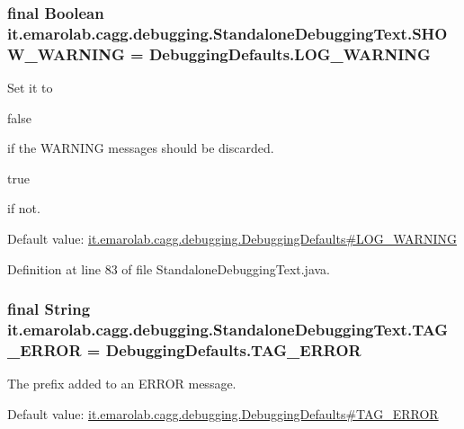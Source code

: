 \hypertarget{classit_1_1emarolab_1_1cagg_1_1debugging_1_1StandaloneDebuggingText_a15ac1cd7df84553b0a7e1990469ea00b}{
\subsubsection[{S\-H\-O\-W\-\_\-\-W\-A\-R\-N\-I\-N\-G}]{\setlength{\rightskip}{0pt plus 5cm}final Boolean it.\-emarolab.\-cagg.\-debugging.\-Standalone\-Debugging\-Text.\-S\-H\-O\-W\-\_\-\-W\-A\-R\-N\-I\-N\-G = {\bf Debugging\-Defaults.\-L\-O\-G\-\_\-\-W\-A\-R\-N\-I\-N\-G}\hspace{0.3cm}{\ttfamily [static]}}}\label{classit_1_1emarolab_1_1cagg_1_1debugging_1_1StandaloneDebuggingText_a15ac1cd7df84553b0a7e1990469ea00b}
Set it to
\begin{DoxyCode}
\textcolor{keyword}{false} 
\end{DoxyCode}
 if the W\-A\-R\-N\-I\-N\-G messages should be discarded.
\begin{DoxyCode}
\textcolor{keyword}{true} 
\end{DoxyCode}
 if not. \par
 Default value\-: \hyperlink{classit_1_1emarolab_1_1cagg_1_1debugging_1_1DebuggingDefaults_a609da8270808ac3bf908af33bd454c36}{it.\-emarolab.\-cagg.\-debugging.\-Debugging\-Defaults\#\-L\-O\-G\-\_\-\-W\-A\-R\-N\-I\-N\-G} 

Definition at line 83 of file Standalone\-Debugging\-Text.\-java.

\hypertarget{classit_1_1emarolab_1_1cagg_1_1debugging_1_1StandaloneDebuggingText_a87228d13eb7f2bde2398b75b01d61aec}{
\subsubsection[{T\-A\-G\-\_\-\-E\-R\-R\-O\-R}]{\setlength{\rightskip}{0pt plus 5cm}final String it.\-emarolab.\-cagg.\-debugging.\-Standalone\-Debugging\-Text.\-T\-A\-G\-\_\-\-E\-R\-R\-O\-R = Debugging\-Defaults.\-T\-A\-G\-\_\-\-E\-R\-R\-O\-R\hspace{0.3cm}{\ttfamily [static]}}}\label{classit_1_1emarolab_1_1cagg_1_1debugging_1_1StandaloneDebuggingText_a87228d13eb7f2bde2398b75b01d61aec}
The prefix added to an E\-R\-R\-O\-R message.\par
 Default value\-: \hyperlink{classit_1_1emarolab_1_1cagg_1_1debugging_1_1DebuggingDefaults_a573cd0445233309d6c021ddf46e23f7f}{it.\-emarolab.\-cagg.\-debugging.\-Debugging\-Defaults\#\-T\-A\-G\-\_\-\-E\-R\-R\-O\-R} 

